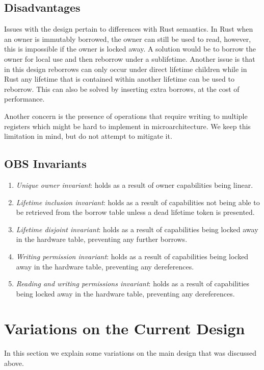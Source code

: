 \subsection{Disadvantages}
\label{sec:designdisadvantages}
Issues with the design pertain to differences with Rust semantics. In Rust when an owner is immutably borrowed, the owner can still be used to read, however, this is impossible if the owner is locked away. A solution would be to borrow the owner for local use and then reborrow under a sublifetime. Another issue is that in this design reborrows can only occur under direct lifetime children while in Rust any lifetime that is contained within another lifetime can be used to reborrow. This can also be solved by inserting extra borrows, at the cost of performance.

Another concern is the presence of operations that require writing to multiple registers which might be hard to implement in microarchitecture. We keep this limitation in mind, but do not attempt to mitigate it.

\subsection{OBS Invariants}
\begin{enumerate}
    \item \textit{Unique owner invariant}: holds as a result of owner capabilities being linear.
    \item \textit{Lifetime inclusion invariant}: holds as a result of capabilities not being able to be retrieved from the borrow table unless a dead lifetime token is presented.
    \item \textit{Lifetime disjoint invariant}: holds as a result of capabilities being locked away in the hardware table, preventing any further borrows.
    \item \textit{Writing permission invariant}: holds as a result of capabilities being locked away in the hardware table, preventing any dereferences.
    \item \textit{Reading and writing permissions invariant}: holds as a result of capabilities being locked away in the hardware table, preventing any dereferences.
\end{enumerate}

\section{Variations on the Current Design}
In this section we explain some variations on the main design that was discussed above.

